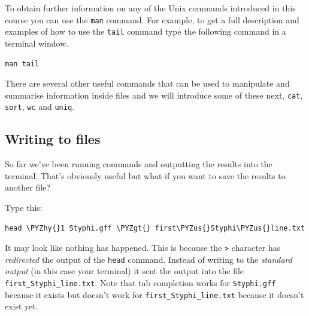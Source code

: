 \documentclass[11pt]{article}
\makeatletter
\def\PYZus{\char`\_}
\def\PYZgt{\char`\>}
\def\PYZhy{\char`\-}
\newcommand{\boxspacing}{\kern\kvtcb@left@rule\kern\kvtcb@boxsep}
\newcommand{\prompt}[4]{
        {\ttfamily\llap{{\color{blue}\LARGE\faKeyboardO\hspace{3pt}#4}}\vspace{-\baselineskip}}
    }
\makeatother
\begin{document}
To obtain further information on any of the Unix commands introduced in
this course you can use the \texttt{man} command. For example, to get a
full description and examples of how to use the \texttt{tail} command
type the following command in a terminal window.

    \begin{tcolorbox}[breakable, size=fbox, boxrule=1pt, pad at break*=1mm,colback=cellbackground, colframe=cellborder]
\prompt{In}{incolor}{ }{\boxspacing}
\begin{Verbatim}[commandchars=\\\{\}]
man tail
\end{Verbatim}
\end{tcolorbox}

    There are several other useful commands that can be used to manipulate
and summarise information inside files and we will introduce some of
these next, \texttt{cat}, \texttt{sort}, \texttt{wc} and \texttt{uniq}.

    \hypertarget{writing-to-files}{%
\subsection{Writing to files}\label{writing-to-files}}

So far we've been running commands and outputting the results into the
terminal. That's obviously useful but what if you want to save the
results to another file?

Type this:

    \begin{tcolorbox}[breakable, size=fbox, boxrule=1pt, pad at break*=1mm,colback=cellbackground, colframe=cellborder]
\prompt{In}{incolor}{ }{\boxspacing}
\begin{Verbatim}[commandchars=\\\{\}]
head \PYZhy{}1 Styphi.gff \PYZgt{} first\PYZus{}Styphi\PYZus{}line.txt
\end{Verbatim}
\end{tcolorbox}

    It may look like nothing has happened. This is because the
\texttt{\textgreater{}} character has \textit{redirected} the output of
the \texttt{head} command. Instead of writing to the \textit{standard
output} (in this case your terminal) it sent the output into the file
\texttt{first\_Styphi\_line.txt}. Note that tab completion works for
\texttt{Styphi.gff} because it exists but doesn't work for
\texttt{first\_Styphi\_line.txt} because it doesn't exist yet.
\end{document}
